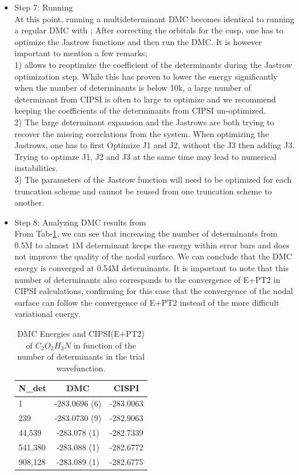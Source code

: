 \begin{itemize}
\item Step 7: Running \qmcpack \\
At this point, running a multideterminant DMC becomes identical to running a regular DMC with \qmcpack; 
After correcting the orbitals for the cusp, one has to optimize the Jastrow functions and then run the DMC. 
It is however important to mention a few remarks;\\

1) \qmcpack allows to reoptimize the coefficient of the determinants during the Jastrow optimization step. While this has proven to lower the energy significantly when the number of determinants is below 10k, a large number of determinant from CIPSI is often to large to optimize and we recommend keeping the coefficients of the determinants from CIPSI un-optimized.\\

2) The large determinant expansion and the Jastrows are both trying to recover the missing correlations from the system. When optimizing the Jastrows, one has to first Optimize J1 and J2, without the J3 then adding J3. Trying to optimze J1, J2 and J3 at the same time may lead to numerical instabilities.\\

3) The parameters of the Jastrow function will need to be optimized for each truncation scheme and cannot be reused from one truncation scheme to another.

\item Step 8: Analyzing DMC results from \qmcpack \\

From Tab-\ref{TAB:CIPSI-DMC}, we can see that increasing the number of determinants from 0.5M to almost 1M determinant keeps the energy within error bars and does not improve the quality of the nodal surface. We can conclude that the DMC energy is converged at 0.54M determinants. It is important to note that this number of determinants also corresponds to the convergence of E+PT2 in CIPSI calculations, confirming for this case that the convergence of the nodal surface can follow the convergence of E+PT2 instead of the more difficult variational energy.   


\begin{table}[t]
\centering
\caption{DMC Energies and CIPSI(E+PT2) of $C_2O_2H_3N$ in function of the number of determinants in the trial wavefunction.}
\label{TAB:CIPSI-DMC}
\begin{tabular}{l|c|c}
\hline 
N\_det & DMC& CISPI\\
\hline
1 & -283.0696 (6)&-283.0063\\
239 & -283.0730 (9)&-282.9063\\
44,539 & -283.078 (1)&-282.7339\\
541,380 & -283.088 (1)&-282.6772\\
908,128& -283.089  (1)&-282.6775\end{tabular}
\end{table}

\end{itemize}

